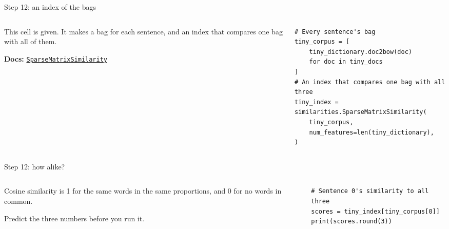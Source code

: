\documentclass[9pt,aspectratio=169]{beamer}
\begin{document}
\begin{frame}[fragile]{Step 12: an index of the bags}
    \begin{columns}[T]
        \begin{column}{0.37\textwidth}
            This cell is given. It makes a bag for each sentence, and an index that compares one bag with all of them.

            \medskip
            {\scriptsize\textbf{Docs:} \href{https://radimrehurek.com/gensim/similarities/docsim.html}{\texttt{SparseMatrixSimilarity}}\par}
        \end{column}
        \begin{column}{0.6\textwidth}
\begin{lstlisting}
# Every sentence's bag
tiny_corpus = [
    tiny_dictionary.doc2bow(doc)
    for doc in tiny_docs
]
# An index that compares one bag with all three
tiny_index = similarities.SparseMatrixSimilarity(
    tiny_corpus,
    num_features=len(tiny_dictionary),
)
\end{lstlisting}
        \end{column}
    \end{columns}
\end{frame}

\begin{frame}[fragile]{Step 12: how alike?}
    \begin{columns}[T]
        \begin{column}{0.37\textwidth}
            Cosine similarity is 1 for the same words in the same proportions, and 0 for no words in common.

            \medskip
            Predict the three numbers before you run it.
        \end{column}
        \begin{column}{0.6\textwidth}
\begin{lstlisting}
# Sentence 0's similarity to all three
scores = tiny_index[tiny_corpus[0]]
print(scores.round(3))
\end{lstlisting}
        \end{column}
    \end{columns}
\end{frame}
\end{document}
